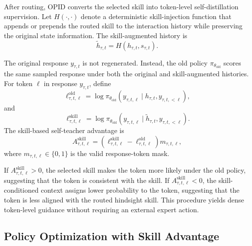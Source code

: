 \documentclass{llmxive}
\begin{document}
After routing, OPID{} converts the selected skill into token-level self-distillation supervision. Let $H(\cdot,\cdot)$ denote a deterministic skill-injection function that appends or prepends the routed skill to the interaction history while preserving the original state information. The skill-augmented history is
\begin{equation*}
    \tilde{h}_{\tau,t} = H(h_{\tau,t}, s_{\tau,t}).
\end{equation*}

The original response $y_{\tau,t}$ is not regenerated. Instead, the old policy $\pi_{\theta_{\mathrm{old}}}$ scores the same sampled response under both the original and skill-augmented histories. For token $\ell$ in response $y_{\tau,t}$, define
\begin{equation*}
    \ell^{\mathrm{old}}_{\tau,t,\ell}
    =
    \log \pi_{\theta_{\mathrm{old}}}
    \left(
        y_{\tau,t,\ell}
        \mid
        h_{\tau,t}, y_{\tau,t,<\ell}
    \right),
\end{equation*}
and
\begin{equation*}
    \ell^{\mathrm{skill}}_{\tau,t,\ell}
    =
    \log \pi_{\theta_{\mathrm{old}}}
    \left(
        y_{\tau,t,\ell}
        \mid
        \tilde{h}_{\tau,t}, y_{\tau,t,<\ell}
    \right).
\end{equation*}
The skill-based self-teacher advantage is
\begin{equation*}
    A^{\mathrm{skill}}_{\tau,t,\ell}
    =
    \left(
        \ell^{\mathrm{skill}}_{\tau,t,\ell}
        -
        \ell^{\mathrm{old}}_{\tau,t,\ell}
    \right)
    m_{\tau,t,\ell},
\end{equation*}
where $m_{\tau,t,\ell}\in\{0,1\}$ is the valid response-token mask.

If $A^{\mathrm{skill}}_{\tau,t,\ell}>0$, the selected skill makes the token more likely under the old policy, suggesting that the token is consistent with the skill. If \(A^{\mathrm{skill}}_{\tau,t,\ell}<0\), the skill-conditioned context assigns lower probability to the token, suggesting that the token is less aligned with the routed hindsight skill. This procedure yields dense token-level guidance without requiring an external expert action.

\subsection{Policy Optimization with Skill Advantage}
\end{document}
